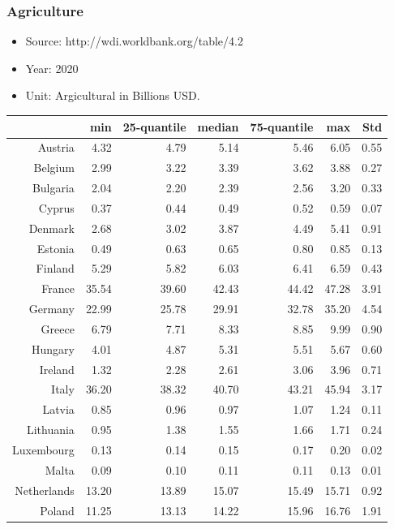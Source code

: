 \documentclass[a4paper,twoside,10pt]{article}
\begin{document}
\subsubsection{Agriculture}
	\begin{itemize}
	\item Source: http://wdi.worldbank.org/table/4.2
	\item Year:  2020
	\item Unit: Argicultural in Billions USD.
\end{itemize}  
\begin{table}[H]
	\centering
	\begin{tabular}{|r|rrrrr|r|}
  \hline
& min & 25-quantile & median & 75-quantile & max & Std \\ 
\hline
Austria & 4.32 & 4.79 & 5.14 & 5.46 & 6.05 & 0.55 \\ 
Belgium & 2.99 & 3.22 & 3.39 & 3.62 & 3.88 & 0.27 \\ 
Bulgaria & 2.04 & 2.20 & 2.39 & 2.56 & 3.20 & 0.33 \\ 
Cyprus & 0.37 & 0.44 & 0.49 & 0.52 & 0.59 & 0.07 \\ 
Denmark & 2.68 & 3.02 & 3.87 & 4.49 & 5.41 & 0.91 \\ \hline
Estonia & 0.49 & 0.63 & 0.65 & 0.80 & 0.85 & 0.13 \\ 
Finland & 5.29 & 5.82 & 6.03 & 6.41 & 6.59 & 0.43 \\ 
France & 35.54 & 39.60 & 42.43 & 44.42 & 47.28 & 3.91 \\ 
Germany & 22.99 & 25.78 & 29.91 & 32.78 & 35.20 & 4.54 \\ 
Greece & 6.79 & 7.71 & 8.33 & 8.85 & 9.99 & 0.90 \\ \hline
Hungary & 4.01 & 4.87 & 5.31 & 5.51 & 5.67 & 0.60 \\ 
Ireland & 1.32 & 2.28 & 2.61 & 3.06 & 3.96 & 0.71 \\ 
Italy & 36.20 & 38.32 & 40.70 & 43.21 & 45.94 & 3.17 \\ 
Latvia & 0.85 & 0.96 & 0.97 & 1.07 & 1.24 & 0.11 \\ 
Lithuania & 0.95 & 1.38 & 1.55 & 1.66 & 1.71 & 0.24 \\ \hline
Luxembourg & 0.13 & 0.14 & 0.15 & 0.17 & 0.20 & 0.02 \\ 
Malta & 0.09 & 0.10 & 0.11 & 0.11 & 0.13 & 0.01 \\ 
Netherlands & 13.20 & 13.89 & 15.07 & 15.49 & 15.71 & 0.92 \\ 
Poland & 11.25 & 13.13 & 14.22 & 15.96 & 16.76 & 1.91 \\ 

\end{tabular}
\end{table}
\end{document}
